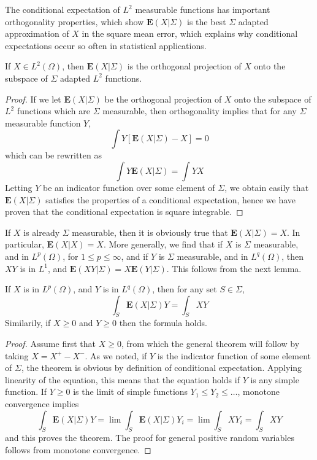 The conditional expectation of $L^2$ measurable functions has important orthogonality properties, which show $\mathbf{E}(X|\Sigma)$ is the best $\Sigma$ adapted approximation of $X$ in the square mean error, which explains why conditional expectations occur so often in statistical applications.

\begin{theorem}
    If $X \in L^2(\Omega)$, then $\mathbf{E}(X|\Sigma)$ is the orthogonal projection of $X$ onto the subspace of $\Sigma$ adapted $L^2$ functions.
\end{theorem}
\begin{proof}
    If we let $\mathbf{E}(X|\Sigma)$ be the orthogonal projection of $X$ onto the subspace of $L^2$ functions which are $\Sigma$ measurable, then orthogonality implies that for any $\Sigma$ measurable function $Y$,
    \[ \int Y[\mathbf{E}(X|\Sigma) - X] = 0 \]
    which can be rewritten as
    \[ \int Y \mathbf{E}(X|\Sigma) = \int YX \]
    Letting $Y$ be an indicator function over some element of $\Sigma$, we obtain easily that $\mathbf{E}(X|\Sigma)$ satisfies the properties of a conditional expectation, hence we have proven that the conditional expectation is square integrable.
\end{proof}

If $X$ is already $\Sigma$ measurable, then it is obviously true that $\mathbf{E}(X|\Sigma) = X$. In particular, $\mathbf{E}(X|X) = X$. More generally, we find that if $X$ is $\Sigma$ measurable, and in $L^p(\Omega)$, for $1 \leq p \leq \infty$, and if $Y$ is $\Sigma$ measurable, and in $L^q(\Omega)$, then $XY$ is in $L^1$, and $\mathbf{E}(XY|\Sigma) = X\mathbf{E}(Y|\Sigma)$. This follows from the next lemma.

\begin{lemma}
    If $X$ is in $L^p(\Omega)$, and $Y$ is in $L^q(\Omega)$, then for any set $S \in \Sigma$,
    \[ \int_S \mathbf{E}(X|\Sigma) Y = \int_S XY \]
    Similarily, if $X \geq 0$ and $Y \geq 0$ then the formula holds.
\end{lemma}
\begin{proof}
    Assume first that $X \geq 0$, from which the general theorem will follow by taking $X = X^+ - X^-$. As we noted, if $Y$ is the indicator function of some element of $\Sigma$, the theorem is obvious by definition of conditional expectation. Applying linearity of the equation, this means that the equation holds if $Y$ is any simple function. If $Y \geq 0$ is the limit of simple functions $Y_1 \leq Y_2 \leq \dots$, monotone convergence implies
    \[ \int_S \mathbf{E}(X|\Sigma) Y = \lim \int_S \mathbf{E}(X|\Sigma) Y_i = \lim \int_S XY_i = \int_S XY \]
    and this proves the theorem. The proof for general positive random variables follows from monotone convergence.
\end{proof}

